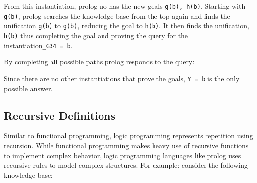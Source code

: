 From this instantiation, prolog no has the new goals
\texttt{g(b),\ h(b)}. Starting with \texttt{g(b)}, prolog searches the
knowledge base from the top again and finds the unification
\texttt{g(b)} to \texttt{g(b)}, reducing the goal to \texttt{h(b)}. It
then finds the unification, \texttt{h(b)} thus completing the goal and
proving the query for the instantiation\texttt{\_G34\ =\ b}.

By completing all possible paths prolog responds to the query:

\begin{Shaded}
\begin{Highlighting}[]
 \KeywordTok{=}
\end{Highlighting}
\end{Shaded}

Since there are no other instantiations that prove the goals,
\texttt{Y\ =\ b} is the only possible answer.

\subsection{Recursive
Definitions}\label{logic-programming-paradigm.md__recursive-definitions}

Similar to functional programming, logic programming represents
repetition using recursion. While functional programming makes heavy use
of recursive functions to implement complex behavior, logic programming
languages like prolog uses recursive rules to model complex structures.
For example: consider the following knowledge base:

\begin{Shaded}
\begin{Highlighting}[]
\KeywordTok{,}\NormalTok{)  }\KeywordTok{:{-}}\KeywordTok{,}\NormalTok{)}
\KeywordTok{,}\NormalTok{)  }\KeywordTok{:{-}}
\KeywordTok{,}\NormalTok{)}\KeywordTok{,}
\KeywordTok{,}\NormalTok{)}

\KeywordTok{,}
\KeywordTok{,}
\KeywordTok{,} 
\end{Highlighting}
\end{Shaded}

